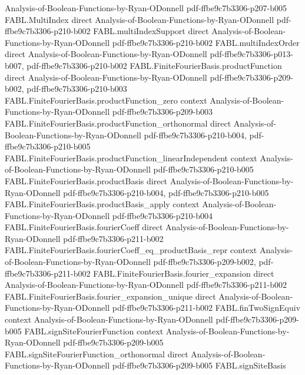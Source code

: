 \begin{theorem}
  {Analysis-of-Boolean-Functions-by-Ryan-ODonnell}
  {pdf-ffbe9c7b3306-p207-b005}
\proofstep
  {FABL.MultiIndex}
  {direct}
  {Analysis-of-Boolean-Functions-by-Ryan-ODonnell}
  {pdf-ffbe9c7b3306-p210-b002}
\proofstep
  {FABL.multiIndexSupport}
  {direct}
  {Analysis-of-Boolean-Functions-by-Ryan-ODonnell}
  {pdf-ffbe9c7b3306-p210-b002}
\proofstep
  {FABL.multiIndexOrder}
  {direct}
  {Analysis-of-Boolean-Functions-by-Ryan-ODonnell}
  {pdf-ffbe9c7b3306-p013-b007,
    pdf-ffbe9c7b3306-p210-b002}
\proofstep
  {FABL.FiniteFourierBasis.productFunction}
  {direct}
  {Analysis-of-Boolean-Functions-by-Ryan-ODonnell}
  {pdf-ffbe9c7b3306-p209-b002,
    pdf-ffbe9c7b3306-p210-b003}
\proofstep
  {FABL.FiniteFourierBasis.productFunction_zero}
  {context}
  {Analysis-of-Boolean-Functions-by-Ryan-ODonnell}
  {pdf-ffbe9c7b3306-p209-b003}
\proofstep
  {FABL.FiniteFourierBasis.productFunction_orthonormal}
  {direct}
  {Analysis-of-Boolean-Functions-by-Ryan-ODonnell}
  {pdf-ffbe9c7b3306-p210-b004,
    pdf-ffbe9c7b3306-p210-b005}
\proofstep
  {FABL.FiniteFourierBasis.productFunction_linearIndependent}
  {context}
  {Analysis-of-Boolean-Functions-by-Ryan-ODonnell}
  {pdf-ffbe9c7b3306-p210-b005}
\proofstep
  {FABL.FiniteFourierBasis.productBasis}
  {direct}
  {Analysis-of-Boolean-Functions-by-Ryan-ODonnell}
  {pdf-ffbe9c7b3306-p210-b004,
    pdf-ffbe9c7b3306-p210-b005}
\proofstep
  {FABL.FiniteFourierBasis.productBasis_apply}
  {context}
  {Analysis-of-Boolean-Functions-by-Ryan-ODonnell}
  {pdf-ffbe9c7b3306-p210-b004}
\proofstep
  {FABL.FiniteFourierBasis.fourierCoeff}
  {direct}
  {Analysis-of-Boolean-Functions-by-Ryan-ODonnell}
  {pdf-ffbe9c7b3306-p211-b002}
\proofstep
  {FABL.FiniteFourierBasis.fourierCoeff_eq_productBasis_repr}
  {context}
  {Analysis-of-Boolean-Functions-by-Ryan-ODonnell}
  {pdf-ffbe9c7b3306-p209-b002,
    pdf-ffbe9c7b3306-p211-b002}
\proofstep
  {FABL.FiniteFourierBasis.fourier_expansion}
  {direct}
  {Analysis-of-Boolean-Functions-by-Ryan-ODonnell}
  {pdf-ffbe9c7b3306-p211-b002}
\proofstep
  {FABL.FiniteFourierBasis.fourier_expansion_unique}
  {direct}
  {Analysis-of-Boolean-Functions-by-Ryan-ODonnell}
  {pdf-ffbe9c7b3306-p211-b002}
\proofstep
  {FABL.finTwoSignEquiv}
  {context}
  {Analysis-of-Boolean-Functions-by-Ryan-ODonnell}
  {pdf-ffbe9c7b3306-p209-b005}
\proofstep
  {FABL.signSiteFourierFunction}
  {context}
  {Analysis-of-Boolean-Functions-by-Ryan-ODonnell}
  {pdf-ffbe9c7b3306-p209-b005}
\proofstep
  {FABL.signSiteFourierFunction_orthonormal}
  {direct}
  {Analysis-of-Boolean-Functions-by-Ryan-ODonnell}
  {pdf-ffbe9c7b3306-p209-b005}
\proofstep
  {FABL.signSiteBasis}

\end{theorem}
